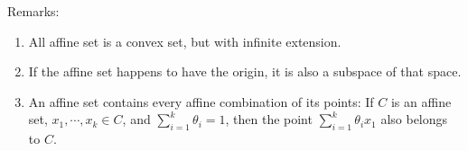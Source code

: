\documentclass{article}
\begin{document}
Remarks:
\begin{enumerate}
    \item All affine set is a convex set, but with infinite extension.
    \item If the affine set happens to have the origin, it is also a subspace of that space.
    \item An affine set contains every affine combination of its points: If \(C\) is an affine set, $x_1, \cdots , x_k \in C$, and \(\sum_{i=1}^{k} \theta_i = 1\), then the point \(\sum_{i=1}^{k} \theta_ix_1 \) also belongs to \(C\).
    
\end{enumerate}
\end{document}
